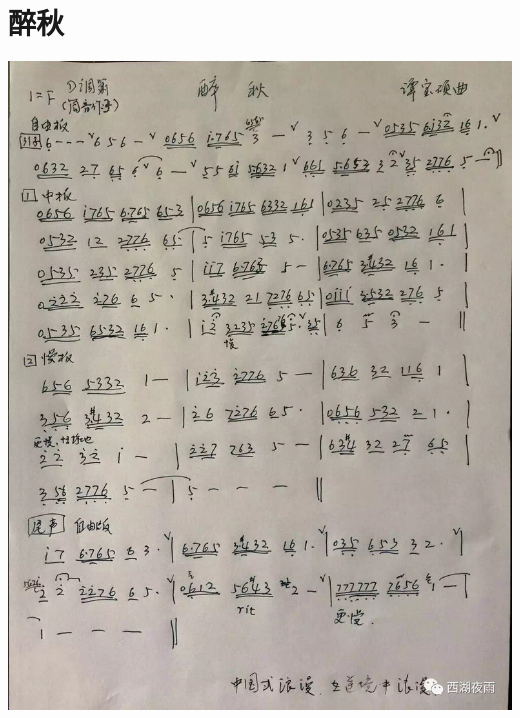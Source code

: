 \documentclass[cn,pad,twocol]{elegantbook}
\begin{document}
\section{醉秋}\includegraphics[width=\textwidth]{dongxiao/20200819/醉秋.jpeg}
\end{document}
